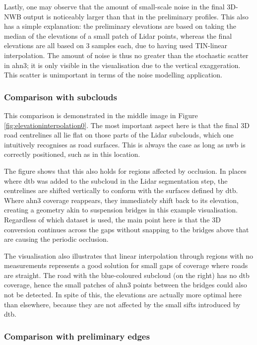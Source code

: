 Lastly, one may observe that the amount of small-scale noise in the final 3D-NWB output is noticeably larger than that in the preliminary profiles. This also has a simple explanation: the preliminary elevations are based on taking the median of the elevations of a small patch of Lidar points, whereas the final elevations are all based on 3 samples each, due to having used TIN-linear interpolation. The amount of noise is thus no greater than the stochastic scatter in \ac{ahn3}; it is only visible in the visualisation due to the vertical exaggeration. This scatter is unimportant in terms of the noise modelling application.

\subsubsection{Comparison with subclouds}

This comparison is demonstrated in the middle image in Figure \ref{fig:elevationinterpolation0}. The most important aspect here is that the final 3D road centrelines all lie flat on those parts of the Lidar subclouds, which one intuitively recognises as road surfaces. This is always the case as long as \ac{nwb} is correctly positioned, such as in this location.

The figure shows that this also holds for regions affected by occlusion. In places where \ac{dtb} was added to the subcloud in the Lidar segmentation step, the centrelines are shifted vertically to conform with the surfaces defined by \ac{dtb}. Where \ac{ahn3} coverage reappears, they immediately shift back to its elevation, creating a geometry akin to suspension bridges in this example visualisation. Regardless of which dataset is used, the main point here is that the 3D conversion continues across the gaps without snapping to the bridges above that are causing the periodic occlusion.

The visualisation also illustrates that linear interpolation through regions with no measurements represents a good solution for small gaps of coverage where roads are straight. The road with the blue-coloured subcloud (on the right) has no \ac{dtb} coverage, hence the small patches of \ac{ahn3} points between the bridges could also not be detected. In spite of this, the elevations are actually more optimal here than elsewhere, because they are not affected by the small sifts introduced by \ac{dtb}.

\subsubsection{Comparison with preliminary edges}

